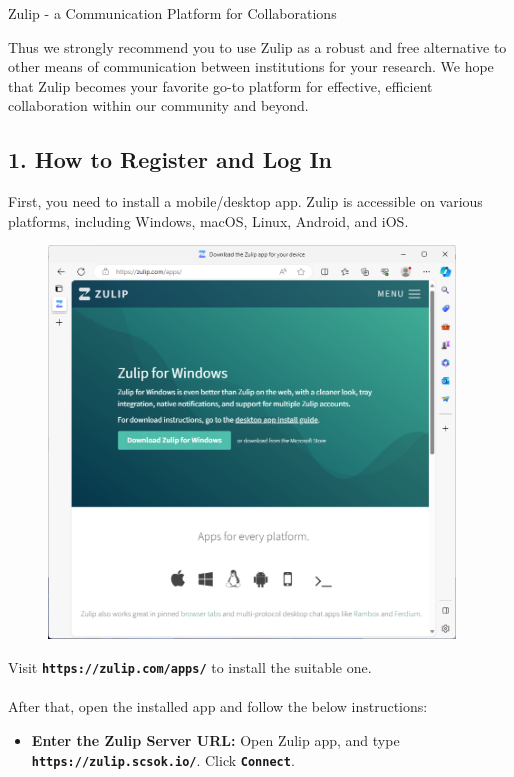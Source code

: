 \begin{coverpage}{Zulip - a Communication Platform for Collaborations}
{Thus we strongly recommend you to use Zulip as a robust and free alternative to other means of communication between institutions for your research. We hope that Zulip becomes your favorite go-to platform for effective, efficient collaboration within our community and beyond.

\subsection*{1. How to Register and Log In}
First, you need to install a mobile/desktop app. Zulip is accessible on various platforms, including Windows, macOS, Linux, Android, and iOS.

\begin{figure}[h]
\centering
\includegraphics[width=10.8cm]{images/zulip-apps.png}
\end{figure}

{\centering \noindent Visit \textbf{\texttt{https://zulip.com/apps/}} to install the suitable one.}
\\
\\
After that, open the installed app and follow the below instructions:
\begin{itemize}[leftmargin=0.5cm, rightmargin=0.5cm]
\item \textbf{Enter the Zulip Server URL:} Open Zulip app, and type \\ \textbf{\texttt{https://zulip.scsok.io/}}. Click \textbf{\texttt{Connect}}.


\end{itemize}}
\end{coverpage}
